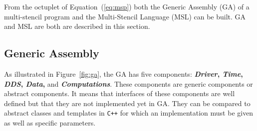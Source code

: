 From the octuplet of Equation~(\ref{eq:msp}) both the Generic Assembly (GA) of a multi-stencil program and the Multi-Stencil Language (MSL) can be built. GA and MSL are both are described in this section. 

\subsection{Generic Assembly}
As illustrated in Figure~\ref{fig:ga}, the GA has five components: {\bf \emph{Driver}, \emph{Time}, \emph{DDS}, \emph{Data}, } and {\bf \emph{Computations}}. These components are generic components or abstract components. It means that interfaces of these components are well defined but that they are not implemented yet in GA. They can be compared to abstract classes and templates in \texttt{C++} for which an implementation must be given as well as specific parameters.

